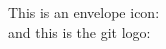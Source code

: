 \documentclass[a4paper, oneside, final]{article}
\begin{document}
This is an envelope icon: \faEnvelopeR \\
and this is the git logo: \faGit
\end{document}
